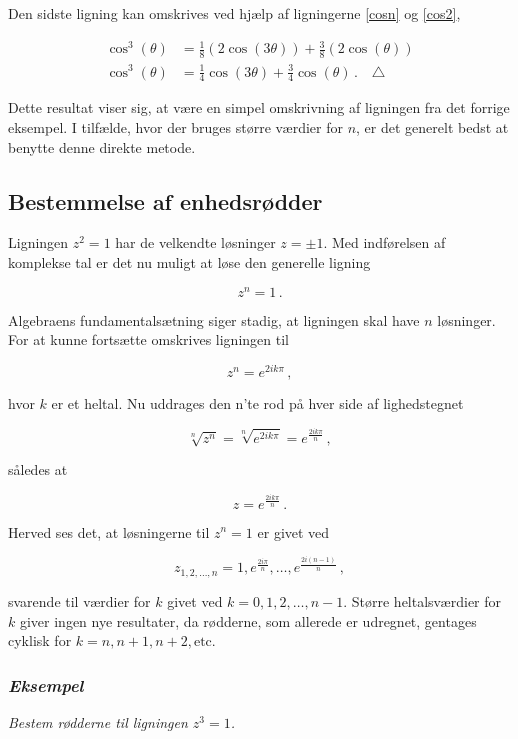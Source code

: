 \documentclass[a4paper, 12pt,titlepage]{article}
\begin{document}
Den sidste ligning kan omskrives ved hjælp af ligningerne \eqref{cosn} og \eqref{cos2},

\begin{align*}
    \cos^3 (\theta) &= \frac{1}{8}\left(2\cos(3\theta)\right) + \frac{3}{8}\left(2\cos(\theta)\right) \\
    \cos^3 (\theta) &= \frac{1}{4}\cos(3\theta) + \frac{3}{4}\cos(\theta)\,. \quad \triangle
\end{align*}

Dette resultat viser sig, at være en simpel omskrivning af ligningen fra det forrige eksempel. I tilfælde, hvor der bruges større værdier for \(n\), er det generelt bedst at benytte denne direkte metode.


\subsection{Bestemmelse af enhedsrødder}
\label{sec:orgd5f563d}

Ligningen \(z^2=1\) har de velkendte løsninger \(z=\pm1\). Med indførelsen af komplekse tal er det nu muligt at løse den generelle ligning 

$$z^n = 1\,.$$ 

Algebraens fundamentalsætning siger stadig, at ligningen skal have \(n\) løsninger. For at kunne fortsætte omskrives ligningen til

$$z^n = e^{2ik\pi} \,,$$

hvor \(k\) er et heltal. Nu uddrages den n'te rod på hver side af lighedstegnet

$$\sqrt[n]{z^{n}} = \sqrt[n]{e^{2 i k \pi}}= e^{\frac{2 i k \pi}{n}}\,,$$

således at

$$z=e^{\frac{2 i k \pi}{n}}\,.$$

Herved ses det, at løsningerne til \(z^n =1\) er givet ved

$$z_{1,2,\dots,n} = 1, e^{\frac{2 i \pi}{n}},\dots , e^{\frac{2 i (n-1)}{n}} \,,$$

svarende til værdier for \(k\) givet ved \(k=0,1,2,\dots,n-1\). Større heltalsværdier for \(k\) giver ingen nye resultater, da rødderne, som allerede er udregnet, gentages cyklisk for \(k=n,n+1,n+2, \text{etc}\).

\subsubsection*{\emph{Eksempel}}
\label{sec:org59e4e86}
\emph{Bestem rødderne til ligningen \(z^3=1\).}
\end{document}
